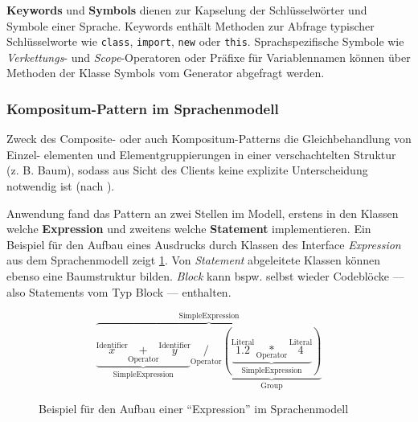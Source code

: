 \textbf{Keywords} und \textbf{Symbols} dienen zur Kapselung der Schlüsselwörter und Symbole einer Sprache. Keywords enthält Methoden zur Abfrage typischer Schlüsselworte wie \texttt{class}, \texttt{import}, \texttt{new} oder \texttt{this}. Sprachspezifische Symbole wie \emph{Verkettungs}- und \emph{Scope}-Operatoren oder Präfixe für Variablennamen können über Methoden der Klasse Symbols vom Generator abgefragt werden.

\subsubsection{Kompositum-Pattern im Sprachenmodell}
\label{sec:composite_pattern}

Zweck des Composite- oder auch Kompositum-Patterns  die Gleichbehandlung von Einzel-
elementen und Elementgruppierungen in einer verschachtelten Struktur
(z. B. Baum), sodass aus Sicht des Clients keine explizite Unterscheidung
notwendig ist (nach \cite[][S. 102]{patternsKompakt}).

Anwendung fand das Pattern an zwei Stellen im Modell, erstens in den Klassen welche \textbf{Expression} und zweitens welche \textbf{Statement} implementieren.
Ein Beispiel für den Aufbau eines Ausdrucks durch Klassen des Interface \emph{Expression} aus dem Sprachenmodell zeigt \cref{fig:example_expression}. Von \emph{Statement} abgeleitete Klassen können ebenso eine Baumstruktur bilden. \emph{Block} kann bspw. selbst wieder Codeblöcke --- also Statements vom Typ Block --- enthalten. 

\begin{figure}
    \[
        \overbrace{
            \underbrace{
                \overset{\text{Identifier}}{x} \underset{\text{Operator}}{+} \overset{\text{Identifier}}{y}
            }_{\text{SimpleExpression}} 
            \underset{\text{Operator}}{/}
            \underbrace{
                ( 
                    \underbrace{
                        \overset{\text{Literal}}{1.2} \underset{\text{Operator}}{*} \overset{\text{Literal}}{4}
                    }_{\text{SimpleExpression}} 
                )
            }_{\text{Group}}
        }^{\text{SimpleExpression}} 
    \]   
    \caption{Beispiel für den Aufbau einer \enquote{Expression} im Sprachenmodell}
    \label{fig:example_expression}
\end{figure}
